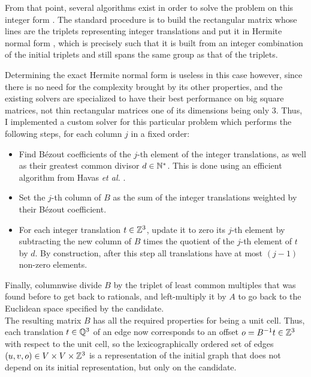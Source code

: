 \documentclass[main.tex]{subfiles}
\begin{document}
From that point, several algorithms exist in order to solve the problem on this integer form \autocite{sparseLinearRational,blackbox,Dixon,Wiedemann}. The standard procedure is to build the rectangular matrix whose lines are the triplets representing integer translations and put it in Hermite normal form \autocite{gcd}, which is precisely such that it is built from an integer combination of the initial triplets and still spans the same group as that of the triplets.

Determining the exact Hermite normal form is useless in this case however, since there is no need for the complexity brought by its other properties, and the existing solvers are specialized to have their best performance on big square matrices, not thin rectangular matrices one of its dimensions being only 3. Thus, I implemented a custom solver for this particular problem which performs the following steps, for each column $j$ in a fixed order:
\begin{itemize}[noitemsep]
	\item Find B\'{e}zout coefficients of the $j$-th element of the integer translations, as well as their greatest common divisor $d\in\mathbb{N}^*$. This is done using an efficient algorithm from Havas \textit{et al.} \autocite{gcd}.
	\item Set the $j$-th column of $B$ as the sum of the integer translations weighted by their B\'{e}zout coefficient. %
	\item For each integer translation $t\in\mathbb{Z}^3$, update it to zero its $j$-th element by subtracting the new column of $B$ times the quotient of the $j$-th element of $t$ by $d$. By construction, after this step all translations have at most $(j-1)$ non-zero elements.
\end{itemize}
Finally, columnwise divide $B$ by the triplet of least common multiples that was found before to get back to rationals, and left-multiply it by $A$ to go back to the Euclidean space specified by the candidate.\\

The resulting matrix $B$ has all the required properties for being a unit cell. Thus, each translation $t\in\mathbb{Q}^3$ of an edge now corresponds to an offset $o = B^{-1}t\in\mathbb{Z}^3$ with respect to the unit cell, so the lexicographically ordered set of edges $(u,v,o)\in V\times V\times\mathbb{Z}^3$ is a representation of the initial graph that does not depend on its initial representation, but only on the candidate.
\end{document}
